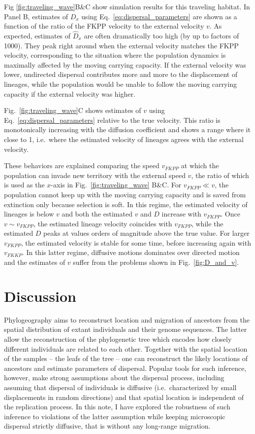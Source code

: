 \documentclass[aps,rmp, twocolumn]{revtex4}
\begin{document}
Fig \ref{fig:traveling_wave}B\&C show simulation results for this traveling habitat. In Panel B, estimates of $D_x$ using Eq.~\ref{eq:dispersal_parameters} are shown as a function of the ratio of the FKPP velocity to the external velocity $v$.
As expected, estimates of $\hat{D}_x$ are often dramatically too high (by up to factors of 1000).
They peak right around when the external velocity matches the FKPP velocity, corresponding to the situation where the population dynamics is maximally affected by the moving carrying capacity.
If the external velocity was lower, undirected dispersal contributes more and more to the displacement of lineages, while the population would be unable to follow the moving carrying capacity if the external velocity was higher.

Fig.~\ref{fig:traveling_wave}C shows estimates of $v$ using Eq.~\ref{eq:dispersal_parameters} relative to the true velocity.
This ratio is monotonically increasing with the diffusion coefficient and shows a range where it close to 1, i.e.~where the estimated velocity of lineages agrees with the external velocity.

These behaviors are explained comparing the speed $v_{FKPP}$ at which the population can invade new territory with the external speed $v$, the ratio of which is used as the $x$-axis in Fig.~\ref{fig:traveling_wave} B\&C.
For $v_{FKPP} \ll v$, the population cannot keep up with the moving carrying capacity and is saved from extinction only because selection is soft.
In this regime, the estimated velocity of lineages is below $v$ and both the estimated $v$ and $D$ increase with $v_{FKPP}$.
Once $v\sim v_{FKPP}$, the estimated lineage velocity coincides with $v_{FKPP}$, while the estimated $D$ peaks at values orders of magnitude above the true value.
For larger $v_{FKPP}$, the estimated velocity is stable for some time, before increasing again with $v_{FKKP}$.
In this latter regime, diffusive motions dominates over directed motion and the estimates of $v$ suffer from the problems shown in Fig.~\ref{fig:D_and_v}.


\section*{Discussion}
Phylogeography aims to reconstruct location and migration of ancestors from the spatial distribution of extant individuals and their genome sequences.
The latter allow the reconstruction of the phylogenetic tree which encodes how closely different individuals are related to each other.
Together with the spatial location of the samples -- the leafs of the tree -- one can reconstruct the likely locations of ancestors and estimate parameters of dispersal.
Popular tools for such inference, however, make strong assumptions about the dispersal process, including assuming that dispersal of individuals is diffusive (i.e.~characterized by small displacements in random directions) and that spatial location is independent of the replication process.
In this note, I have explored the robustness of such inference to violations of the latter assumption while keeping microscopic dispersal strictly diffusive, that is without any long-range migration.
\end{document}
